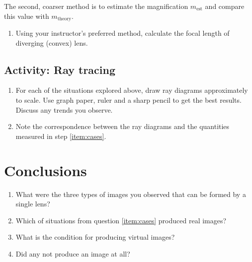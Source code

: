 	The second, coarser method is to estimate the magnification $m_{\textrm{est}}$ and compare this value with $m_{\textrm{theory}}$.
\begin{enumerate}[resume]
	\item Using your instructor's preferred method, calculate the focal length of diverging (convex) lens.
\end{enumerate}

\subsection{Activity: Ray tracing}
\begin{enumerate}[resume]
	\item For each of the situations explored above, draw ray diagrams approximately to scale. Use graph paper, ruler and a sharp pencil to get the best results. Discuss any trends you observe. 
	\item Note the correspondence between the ray diagrams and the quantities measured in step \ref{item:cases}.
\end{enumerate}

\section{Conclusions}
\begin{enumerate}
\item What were the three types of images you observed that can be formed by a single lens? 
\item Which of situations from question \ref{item:cases} produced real images?
\item What is the condition for producing virtual images?
\item Did any not produce an image at all?

\end{enumerate}



\endinput

